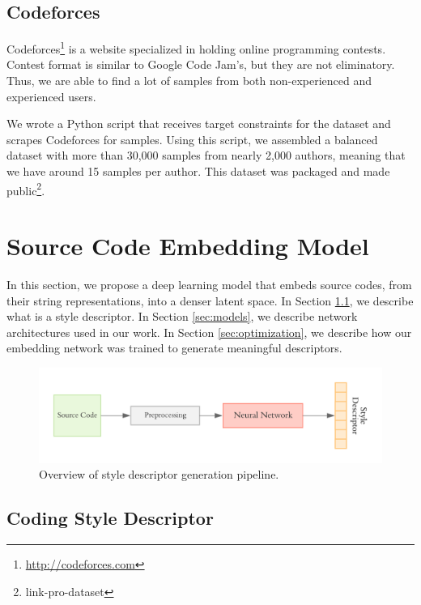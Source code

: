 \subsection{Codeforces}\label{sec:codeforces}

Codeforces\footnote{\url{http://codeforces.com}} is a website specialized in holding online programming contests. Contest format is similar to Google Code Jam's, but they are not eliminatory. Thus, we are able to find a lot of samples from both non-experienced and experienced users.

We wrote a Python script that receives target constraints for the dataset and scrapes Codeforces for samples. Using this script, we assembled a balanced dataset with more than 30,000 samples from nearly 2,000 authors, meaning that we have around 15 samples per author. This dataset was packaged and made public\footnote{link-pro-dataset}.

\section{Source Code Embedding Model}\label{sec:framework}

In this section, we propose a deep learning model that embeds source codes, from their string representations, into a denser latent space. In Section \ref{sec:descriptor}, we describe what is a style descriptor. In Section \ref{sec:models}, we describe network architectures used in our work. In Section \ref{sec:optimization}, we describe how our embedding network was trained to generate meaningful descriptors.

\begin{figure}[ht]
	\centering
	\includegraphics[width=\linewidth]{imgs/pipeline.pdf}
	\caption{Overview of style descriptor generation pipeline.}
	\label{fig:overall}
\end{figure}

\subsection{Coding Style Descriptor}\label{sec:descriptor}

